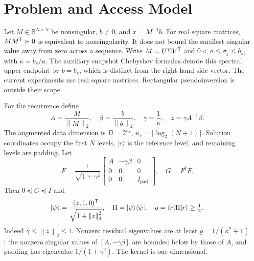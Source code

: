 \documentclass{ieeeaccess}
\newcommand{\norm}[1]{\left\lVert #1\right\rVert}
\newcommand{\ket}[1]{\lvert #1\rangle}\newcommand{\bra}[1]{\langle #1\rvert}
\begin{document}
\section{Problem and Access Model}
Let $M\in\mathbb R^{N\times N}$ be nonsingular, $b\ne0$, and $x=M^{-1}b$. For real square matrices, $MM^{\mathsf T}\succ0$ is equivalent to nonsingularity. It does not bound the smallest singular value away from zero across a sequence. Write $M=U\Sigma V^{\mathsf T}$ and $0<a\le\sigma_j\le b_s$, with $\kappa=b_s/a$. The auxiliary snapshot Chebyshev formulas denote this spectral upper endpoint by $b=b_s$, which is distinct from the right-hand-side vector. The current experiments use real square matrices. Rectangular pseudoinversion is outside their scope.

For the recurrence define
\begin{equation}\label{eq:normal}
A=\frac{M}{\norm M_2},\quad \beta=\frac{b}{\norm b_2},\quad \gamma=\frac{1}{\kappa},\quad z=\gamma A^{-1}\beta.
\end{equation}
The augmented data dimension is $D=2^{n_r}$, $n_r=\lceil\log_2(N+1)\rceil$. Solution coordinates occupy the first $N$ levels, $\ket r$ is the reference level, and remaining levels are padding. Let
\begin{equation}\label{eq:F}
F=\frac1{\sqrt{1+\gamma^2}}
\begin{bmatrix} A&-\gamma\beta&0\\0&0&0\\0&0&I_{\mathrm{pad}}\end{bmatrix},\quad G=F^\dagger F.
\end{equation}
Then $0\preceq G\preceq I$ and
\begin{equation}\label{eq:psi}
\ket\psi=\frac{(z,1,0)^{\tr}}{\sqrt{1+\norm z_2^2}},\quad \Pi=\ket\psi\bra\psi,\quad q=\bra r\Pi\ket r\ge\tfrac12.
\end{equation}
Indeed $\gamma\le\norm z_2\le1$. Nonzero residual eigenvalues are at least $g=1/(\kappa^2+1)$: the nonzero singular values of $[A,-\gamma\beta]$ are bounded below by those of $A$, and padding has eigenvalue $1/(1+\gamma^2)$. The kernel is one-dimensional.
\end{document}
